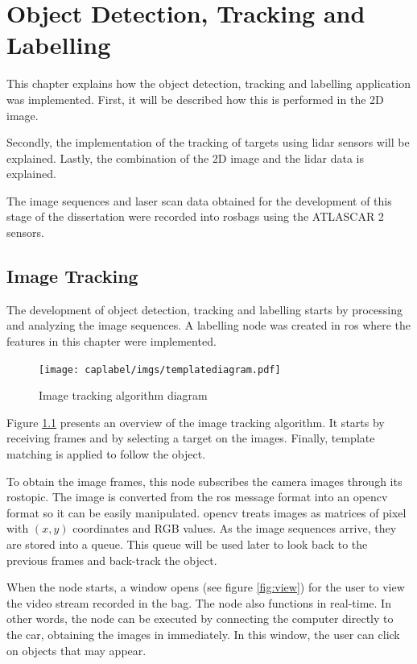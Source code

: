 \chapter{Object Detection, Tracking and Labelling}

This chapter explains how the object detection, tracking and labelling application was implemented. First, it will be described how this is performed in the 2D image. 

Secondly, the implementation of the tracking of targets using \gls{lidar} sensors will be explained. Lastly, the combination of the 2D image and the \gls{lidar} data is explained.

The image sequences and laser scan data obtained for the development of this stage of the dissertation were recorded into rosbags using the ATLASCAR 2 sensors.

\section{Image Tracking}

The development of object detection, tracking and labelling starts by processing and analyzing the image sequences. A labelling node was created in \gls{ros} where the features in this chapter were implemented. 

\begin{figure}[htp]
	
	\centering
	\texttt{[image: caplabel/imgs/templatediagram.pdf]}
	
	\caption{Image tracking algorithm diagram}
	\label{fig:imagediagram}
	
\end{figure}

Figure \ref{fig:imagediagram} presents an overview of the image tracking algorithm. It starts by receiving frames and by selecting a target on the images. Finally, template matching is applied to follow the object.

To obtain the image frames, this node subscribes the camera images through its rostopic. The image is converted from the \gls{ros} message format into an \gls{opencv} format so it can be easily manipulated. \gls{opencv} treats images as matrices of pixel with $(x,y)$ coordinates and RGB values. As the image sequences arrive, they are stored into a queue. This queue will be used later to look back to the previous frames and back-track the object. 

When the node starts, a window opens (see figure \ref{fig:view}) for the user to view the video stream recorded in the bag. The node also functions in real-time. In other words, the node can be executed by connecting the computer directly to the car, obtaining the images in immediately. In this window, the user can click on objects that may appear. 



